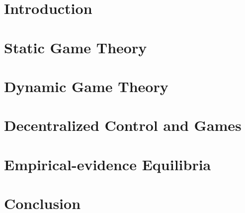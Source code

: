 \chapter{Introduction}


\chapter{Static Game Theory}
\label{chap:static_game_theory}


\chapter{Dynamic Game Theory}
\label{chap:dynamic_game_theory}


\chapter{Decentralized Control and Games}
\label{chap:decentralized_control_and_games}


\chapter{Empirical-evidence Equilibria}
\label{chap:empirical-evidence_equilibria}


\chapter{Conclusion}

